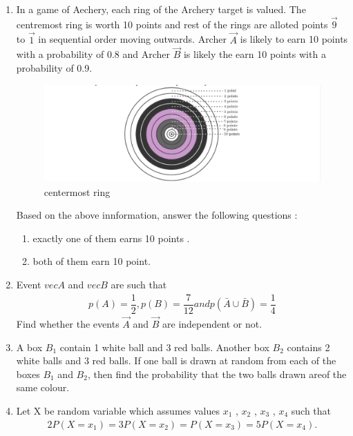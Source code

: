 \begin{enumerate}
\item In a game of Aechery, each ring of the Archery target is valued. The centremost ring is worth 10 points and rest of the rings are alloted points $\vec{9}$ to $\vec{1}$ in sequential order moving outwards.
Archer $\vec{A}$ is likely to earn 10 points with a probability of 0.8 and Archer $\vec{B}$ is likely the earn 10 points with a probability of 0.9.\\
\begin{figure}[H]                                                                                                      
\centering
\includegraphics[width=\columnwidth]{figs/archery}
\caption{centermost ring}                                                                                        
\label{fig:archery3}                                                                                         
\end{figure}
Based on the above innformation, answer the following questions :\\
\begin{enumerate}
\item exactly one of them earns 10 points .
\item both of them earn 10 point.
\end{enumerate}
\item Event $vec{A}$ and $vec{B}$ are such that \begin{align} p(A) = \dfrac{1}{2}, p(B) = \dfrac{7}{12} and p(\bar{A}\cup \bar{B}) = \dfrac{1}{4} \end{align}
Find whether the events  $\vec{A}$ and $\vec{B}$ are independent or not.
\item A box $B_1$ contain 1 white ball  and 3 red balls. Another box $B_2$ contains 2 white balls and 3 red balls. If one ball is drawn at random from each of the boxes $B_1$ and $B_2$, then find the probability that the two balls drawn areof the same colour.
\item Let X be random variable which assumes values $x_1$ , $x_2$ , $x_3$ , $x_4$ such that  \begin{align} 2P(X = x_1) = 3P (X = x_2) = P ( X = x_3) = 5P (X = x_4).\end{align}

\end{enumerate}
